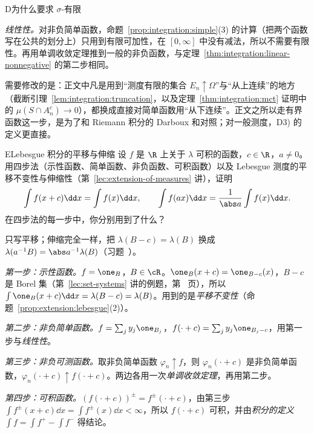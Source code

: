 \begin{probleme}[问题]{D}{为什么要求 \texorpdfstring{$\sigma$}{σ}-有限}
\begin{questions}
\begin{solution}
\emph{线性性。}对非负简单函数，命题~\ref{prop:integration:simple}(3) 的计算（把两个函数写在公共的划分上）只用到有限可加性，在 $[0,\infty]$ 中没有减法，所以不需要有限性。再用单调收敛定理推到一般的非负函数，与定理~\ref{thm:integration:linear-nonnegative} 的第二步相同。

需要修改的是：正文中凡是用到“测度有限的集合 $E_n\uparrow\Omega$”与“从上连续”的地方（截断引理~\ref{lem:integration:truncation}，以及定理~\ref{thm:integration:mct} 证明中的 $\mu(S\cap A_n^c)\to0$），都换成直接对简单函数用“从下连续”。正文之所以走有界函数这一步，是为了和 Riemann 积分的 Darboux 和对照；对一般测度，D3) 的定义更直接。
\end{solution}
\end{questions}
\end{probleme}

\begin{probleme}[问题]{E}{Lebesgue 积分的平移与伸缩}
设 $f$ 是 $\R$ 上关于 $\lambda$ 可积的函数，$c\in\R$，$a\neq0$。用四步法（示性函数、简单函数、非负函数、可积函数）以及 Lebesgue 测度的平移不变性与伸缩性（第~\ref{lec:extension-of-measures} 讲），证明
\[
\int f(x+c)\dd x=\int f(x)\dd x,\qquad\int f(ax)\dd x=\frac1{\abs a}\int f(x)\dd x .
\]
在四步法的每一步中，你分别用到了什么？
\begin{solution}
只写平移；伸缩完全一样，把 $\lambda(B-c)=\lambda(B)$ 换成 $\lambda(a^{-1}B)=\abs a^{-1}\lambda(B)$（习题~）。

\emph{第一步：示性函数。}$f=\one_B$，$B\in\cR$。$\one_B(x+c)=\one_{B-c}(x)$，$B-c$ 是 Borel 集（第~\ref{lec:set-systems} 讲的例题，第~\pageref{we:set-systems:translation} 页），所以 $\int\one_B(x+c)\dd x=\lambda(B-c)=\lambda(B)$。用到的是\emph{平移不变性}（命题~\ref{prop:extension:lebesgue}(2)）。

\emph{第二步：非负简单函数。}$f=\sum_jy_j\one_{B_j}$，$f(\cdot+c)=\sum_jy_j\one_{B_j-c}$，用第一步与\emph{线性性}。

\emph{第三步：非负可测函数。}取非负简单函数 $\varphi_n\uparrow f$，则 $\varphi_n(\cdot+c)$ 是非负简单函数，$\varphi_n(\cdot+c)\uparrow f(\cdot+c)$。两边各用一次\emph{单调收敛定理}，再用第二步。

\emph{第四步：可积函数。}$(f(\cdot+c))^\pm=f^\pm(\cdot+c)$，由第三步 $\int f^\pm(x+c)\dd x=\int f^\pm(x)\dd x<\infty$，所以 $f(\cdot+c)$ 可积，并由\emph{积分的定义} $\int f=\int f^+-\int f^-$ 得结论。
\end{solution}
\end{probleme}


